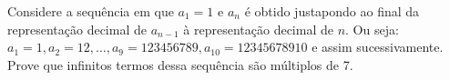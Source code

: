 Considere a sequência em que $a_1 = 1$ e $a_n$ é obtido justapondo ao final da representação decimal de $a_{n-1}$ à representação decimal de $n$. Ou seja: $a_1 = 1, a_2 = 12, \dots, a_9 = 123456789, a_{10} = 12345678910$ e assim sucessivamente. Prove que infinitos termos dessa sequência são múltiplos de 7.
